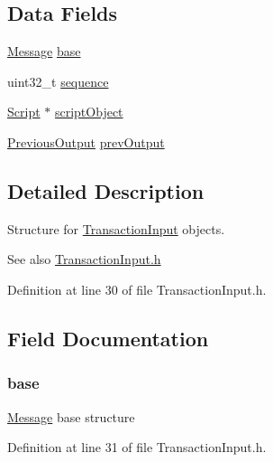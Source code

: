 \subsection*{Data Fields}
\begin{DoxyCompactItemize}
\item 
\hyperlink{struct_m_i_message}{Message} \hyperlink{struct_m_i_transaction_input_a487e4843cf1cf7397eb2e1bcf91cbf3b}{base}
\item 
uint32\_\-t \hyperlink{struct_m_i_transaction_input_a0ab03ef2cc38198d3666a992a245fddf}{sequence}
\item 
\hyperlink{struct_m_i_byte_array}{Script} $\ast$ \hyperlink{struct_m_i_transaction_input_ad2f125749a4bf410b647bc258de817d6}{scriptObject}
\item 
\hyperlink{struct_m_i_previous_output}{PreviousOutput} \hyperlink{struct_m_i_transaction_input_aa2926a5b65b7a9cda9abd6783df43f6f}{prevOutput}
\end{DoxyCompactItemize}


\subsection{Detailed Description}
Structure for \hyperlink{struct_m_i_transaction_input}{TransactionInput} objects. 

\begin{DoxySeeAlso}{See also}
\hyperlink{_m_i_transaction_input_8h}{TransactionInput.h} 
\end{DoxySeeAlso}


Definition at line 30 of file TransactionInput.h.



\subsection{Field Documentation}
\hypertarget{struct_m_i_transaction_input_a487e4843cf1cf7397eb2e1bcf91cbf3b}{
\subsubsection[{base}]{ {\bf base}}}
\label{struct_m_i_transaction_input_a487e4843cf1cf7397eb2e1bcf91cbf3b}
\hyperlink{struct_m_i_message}{Message} base structure 

Definition at line 31 of file TransactionInput.h.

